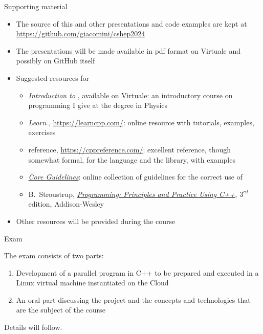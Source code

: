 \begin{frame}{Supporting material}

  \begin{itemize}

  \item The source of this and other presentations and code examples are kept at
    \url{https://github.com/giacomini/cshep2024}

  \item The presentations will be made available in pdf format on Virtuale and
    possibly on GitHub itself

  \item Suggested resources for \Cpp{}
    \begin{itemize}

    \item \textit{Introduction to \Cpp{}}, available on Virtuale: an
      introductory course on programming I give at the degree in Physics

    \item \textit{Learn \Cpp{}}, \url{https://learncpp.com/}: online resource
      with tutorials, examples, exercises
  
    \item \Cpp{} reference, \url{https://cppreference.com/}: excellent
      reference, though somewhat formal, for the language and the library, with
      examples
  
    \item
      \href{https://isocpp.github.io/CppCoreGuidelines/CppCoreGuidelines}{\textit{\Cpp{}
          Core Guidelines}}: online collection of guidelines for the correct use
      of \Cpp{}
  
    \item B.~Stroustrup,
      \href{https://stroustrup.com/programming.html}{\textit{Programming:
          Principles and Practice Using C++}}, $3^{rd}$ edition, Addison-Wesley

    \end{itemize}

  \item Other resources will be provided during the course
  \end{itemize}

\end{frame}

\begin{frame}{Exam}

  The exam consists of two parts:

  \begin{enumerate}
  \item Development of a parallel program in C++ to be prepared and executed in
    a Linux virtual machine instantiated on the Cloud
  \item An oral part discussing the project and the concepts and technologies
    that are the subject of the course
  \end{enumerate}

  Details will follow.

\end{frame}

